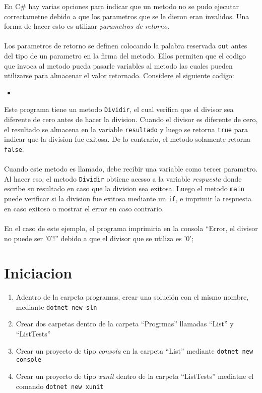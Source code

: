 \documentclass{article}
\newcommand{\perlscript}[2]{
\begin{itemize}
\item[]
\end{itemize}
}
\begin{document}
En C\# hay varias opciones para indicar que un metodo no se pudo ejecutar correctametne
debido a que los parametros que se le dieron eran invalidos. Una forma de hacer esto
es utilizar \emph{parametros de retorno}.
\\\\
Los parametros de retorno se definen colocando la palabra reservada \texttt{out} antes
del tipo de un parametro en la firma del metodo. Ellos permiten que el codigo que invoca
al metodo pueda pasarle variables al metodo las cuales pueden utilizarse para almacenar
el valor retornado. Considere el siguiente codigo:
\perlscript{Parametros}{}
Este programa tiene un metodo \texttt{Dividir}, el cual verifica que el divisor sea
diferente de cero antes de hacer la division. Cuando el divisor es diferente de cero,
el resultado se almacena en la variable \texttt{resultado} y luego se retorna \texttt{true}
para indicar que la division fue exitosa. De lo contrario, el metodo solamente retorna \texttt{false}.
\\\\
Cuando este metodo es llamado, debe recibir una variable como tercer parametro. Al hacer eso,
el metodo \texttt{Dividir} obtiene acesso a la variable \emph{respuesta} donde escribe su
resultado en caso que la division sea exitosa. Luego el metodo \texttt{main} puede verificar
si la division fue exitosa mediante un \texttt{if}, e imprimir la respuesta en caso exitoso
o mostrar el error en caso contrario.
\\\\
En el caso de este ejemplo, el programa imprimiria en la consola ``Error, el divisor no
puede ser '0'!'' debido a que el divisor que se utiliza es '0'; 

\section*{Iniciacion}
\begin{enumerate}
        \item{Adentro de la carpeta programas, crear una soluci\'on con el mismo
        nombre, mediante \texttt{dotnet new sln}}
        \item{Crear dos carpetas dentro de la carpeta ``Progrmas'' llamadas ``List''
        y ``ListTests''}
        \item{Crear un proyecto de tipo \emph{consola} en la carpeta ``List'' mediante
        \texttt{dotnet new console}}
        \item{Crear un proyecto de tipo \emph{xunit} dentro de la carpeta ``ListTests''
        mediatne el comando \texttt{dotnet new xunit}}
\end{enumerate}
\end{document}
